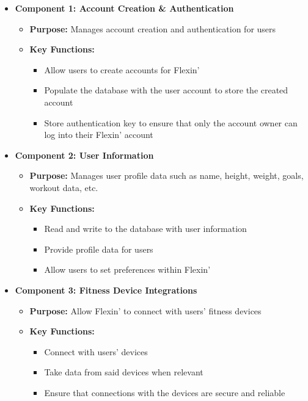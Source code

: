 \documentclass{article}
\begin{document}
\begin{itemize}
    \item \textbf{Component 1: Account Creation \& Authentication}
    \begin{itemize}
        \item \textbf{Purpose:} Manages account creation and authentication for users
        \item \textbf{Key Functions:}
        \begin{itemize}
            \item Allow users to create accounts for Flexin'
            \item Populate the database with the user account to store the created account
            \item Store authentication key to ensure that only the account owner can log into their Flexin' account
        \end{itemize}
    \end{itemize}
    \item \textbf{Component 2: User Information}
    \begin{itemize}
        \item \textbf{Purpose:} Manages user profile data such as name, height, weight, goals, workout data, etc.
        \item \textbf{Key Functions:}
        \begin{itemize}
            \item Read and write to the database with user information
            \item Provide profile data for users
            \item Allow users to set preferences within Flexin'
        \end{itemize}
    \end{itemize}
    \item \textbf{Component 3: Fitness Device Integrations}
    \begin{itemize}
        \item \textbf{Purpose:} Allow Flexin' to connect with users' fitness devices
        \item \textbf{Key Functions:}
        \begin{itemize}
            \item Connect with users' devices
            \item Take data from said devices when relevant
            \item Ensure that connections with the devices are secure and reliable

\end{itemize}
\end{itemize}
\end{itemize}
\end{document}
